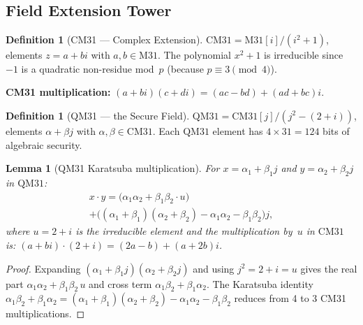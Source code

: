 \documentclass[10pt,twocolumn]{article}
\newtheorem{lemma}[theorem]{Lemma}
\theoremstyle{definition}
\newtheorem{definition}[theorem]{Definition}
\theoremstyle{remark}
\newcommand{\M}{\mathrm{M31}}
\newcommand{\CM}{\mathrm{CM31}}
\newcommand{\QM}{\mathrm{QM31}}
\begin{document}
\subsection{Field Extension Tower}

\begin{definition}[CM31 --- Complex Extension]
  $\CM = \M[i]/(i^2+1)$, elements $z = a+bi$ with $a,b \in \M$.
  The polynomial $x^2+1$ is irreducible since $-1$ is a quadratic
  non-residue mod~$p$ (because $p\equiv 3\pmod{4}$).
\end{definition}

\textbf{CM31 multiplication:}
$(a + bi)(c + di) = (ac - bd) + (ad + bc)i$.

\begin{definition}[QM31 --- the Secure Field]\label{def:qm31}
  $\QM = \CM[j]/(j^2-(2+i))$, elements $\alpha + \beta j$ with
  $\alpha,\beta \in \CM$.
  Each $\QM$ element has $4\times 31 = 124$ bits of algebraic security.
\end{definition}

\begin{lemma}[QM31 Karatsuba multiplication]\label{lem:qm31}
  For $x = \alpha_1 + \beta_1 j$ and $y = \alpha_2 + \beta_2 j$ in $\QM$:
  \begin{multline}\label{eq:qm31-mul}
    x \cdot y = \bigl(\alpha_1\alpha_2 + \beta_1\beta_2\cdot u\bigr) \\
    + \bigl((\alpha_1\!+\!\beta_1)(\alpha_2\!+\!\beta_2)
    - \alpha_1\alpha_2 - \beta_1\beta_2\bigr)j,
  \end{multline}
  where $u = 2+i$ is the irreducible element and the multiplication
  by~$u$ in $\CM$ is: $(a+bi)\cdot(2+i) = (2a-b) + (a+2b)i$.
\end{lemma}

\begin{proof}
  Expanding $({\alpha_1+\beta_1 j})({\alpha_2+\beta_2 j})$ and
  using $j^2 = 2+i = u$ gives the real part
  $\alpha_1\alpha_2 + \beta_1\beta_2\,u$ and cross term
  $\alpha_1\beta_2 + \beta_1\alpha_2$.
  The Karatsuba identity
  $\alpha_1\beta_2+\beta_1\alpha_2 = (\alpha_1+\beta_1)(\alpha_2+\beta_2)-\alpha_1\alpha_2-\beta_1\beta_2$
  reduces from 4 to 3 CM31 multiplications.
\end{proof}
\end{document}
